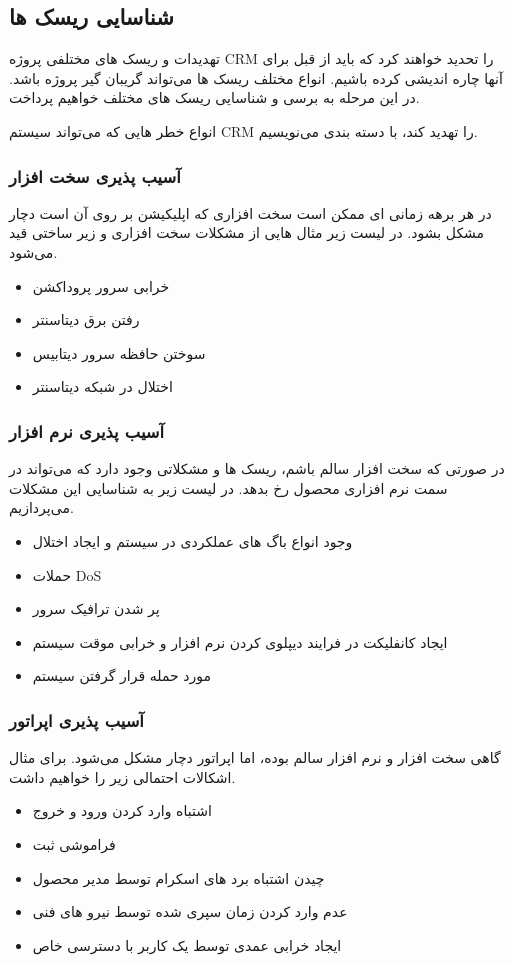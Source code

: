 \subsection{شناسایی ریسک ها}
تهدیدات و ریسک های مختلفی پروژه CRM را تحدید خواهند کرد که باید از قبل برای آنها چاره اندیشی کرده باشیم.
انواع مختلف ریسک ها می‌تواند گریبان گیر پروژه باشد. در این مرحله به برسی و شناسایی ریسک های مختلف خواهیم پرداخت.

انواع خطر هایی که می‌تواند سیستم CRM را تهدید کند، با دسته بندی می‌نویسیم.

\subsubsection{آسیب پذیری سخت افزار}
در هر برهه زمانی ای ممکن است سخت افزاری که اپلیکیشن بر روی آن است دچار مشکل بشود. در لیست زیر مثال هایی از مشکلات سخت افزاری و زیر ساختی قید می‌شود.

\begin{itemize}
	\item خرابی سرور پروداکشن
	\item رفتن برق دیتاسنتر
	\item سوختن حافظه سرور دیتابیس
	\item اختلال در شبکه دیتاسنتر
\end{itemize}

\subsubsection{آسیب پذیری نرم افزار}
در صورتی که سخت افزار سالم باشم، ریسک ها و مشکلاتی وجود دارد که می‌تواند در سمت نرم افزاری محصول رخ بدهد. در لیست زیر به شناسایی این مشکلات می‌پردازیم.

\begin{itemize}
	\item وجود انواع باگ های عملکردی در سیستم و ایجاد اختلال
	\item حملات DoS
	\item پر شدن ترافیک سرور
	\item ایجاد کانفلیکت در فرایند دیپلوی کردن نرم افزار و خرابی موقت سیستم
	\item مورد حمله قرار گرفتن سیستم
\end{itemize}

\subsubsection{آسیب پذیری اپراتور}
گاهی سخت افزار و نرم افزار سالم بوده، اما اپراتور دچار مشکل می‌شود. برای مثال اشکالات احتمالی زیر را خواهیم داشت.

\begin{itemize}
	\item اشتباه وارد کردن ورود و خروج
	\item فراموشی ثبت
	\item چیدن اشتباه برد های اسکرام توسط مدیر محصول
	\item عدم وارد کردن زمان سپری شده توسط نیرو های فنی
	\item ایجاد خرابی عمدی توسط یک کاربر با دسترسی خاص
\end{itemize}
